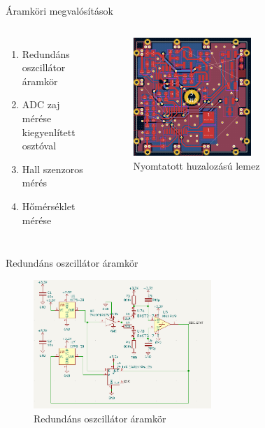 \documentclass[aspectratio=169,xcolor=dvipsnames]{beamer}
\begin{document}
\begin{frame}{Áramköri megvalósítások}

	\begin{columns}[c]
	\begin{enumerate}
	\item Redundáns oszcillátor áramkör
	\item ADC zaj mérése kiegyenlített osztóval
	\item Hall szenzoros mérés
	\item Hőmérséklet mérése
	\end{enumerate}
		\begin{figure}[h]
		\centering
			\includegraphics[width=0.6\textwidth]{nyak}
			
		\caption{Nyomtatott huzalozású lemez}
		\end{figure}
	\end{columns}


\end{frame}


\begin{frame}{Redundáns oszcillátor áramkör}

	\begin{figure}[h]
		\centering
		\includegraphics[width=0.6\textwidth]{redundant}
		\caption{Redundáns oszcillátor áramkör}
	\end{figure}

	\end{frame}
\end{document}
